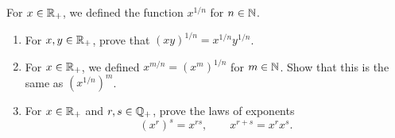 \begingroup
\renewcommand{\labelenumi}{(\alph{enumi})}
\begin{exercise}
  \label{ex:hw03:rational-exponent-laws}
  For $x\in\mathbb{R}_+$, we defined the function $x^{1/n}$ for $n\in\mathbb{N}$.
  \begin{enumerate}
    \item For $x,y\in\mathbb{R}_+$, prove that $(xy)^{1/n}=x^{1/n}y^{1/n}$.
    \item For $x\in\mathbb{R}_+$, we defined $x^{m/n}=(x^m)^{1/n}$ for
      $m\in\mathbb{N}$. Show that this is the same as $(x^{1/n})^m$.
    \item For $x\in\mathbb{R}_+$ and $r,s\in\mathbb{Q}_+$, prove the laws of exponents
      \[
        (x^r)^s=x^{rs},\qquad x^{r+s}=x^rx^s.
      \]
  \end{enumerate}
\end{exercise}
\endgroup
